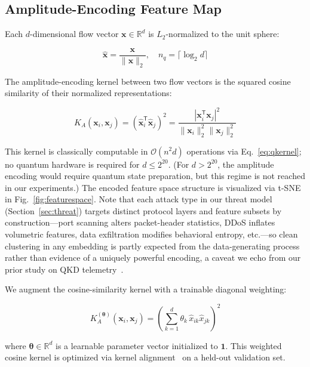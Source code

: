 \documentclass[twocolumn,a4paper,11pt]{article}
\begin{document}
\subsection{Amplitude-Encoding Feature Map}

Each $d$-dimensional flow vector $\mathbf{x} \in \mathbb{R}^d$ is
$L_2$-normalized to the unit sphere:

\begin{equation}
\hat{\mathbf{x}} = \frac{\mathbf{x}}{\|\mathbf{x}\|_2}, \quad
n_q = \lceil \log_2 d \rceil
\label{eq:amplitude_encoding}
\end{equation}

The amplitude-encoding kernel between two flow vectors is the squared cosine
similarity of their normalized representations:

\begin{equation}
K_A(\mathbf{x}_i, \mathbf{x}_j) = \left(\hat{\mathbf{x}}_i^\mathsf{T} \hat{\mathbf{x}}_j\right)^2
= \frac{|\mathbf{x}_i^\mathsf{T} \mathbf{x}_j|^2}{\|\mathbf{x}_i\|_2^2 \|\mathbf{x}_j\|_2^2}
\label{eq:qkernel}
\end{equation}

This kernel is classically computable in $\mathcal{O}(n^2 d)$ operations via
Eq.~\ref{eq:qkernel}; no quantum hardware is required for $d \leq 2^{20}$.
(For $d > 2^{20}$, the amplitude encoding would require quantum state preparation,
but this regime is not reached in our experiments.) The encoded feature space
structure is visualized via t-SNE in Fig.~\ref{fig:featurespace}. Note that each
attack type in our threat model (Section~\ref{sec:threat}) targets distinct
protocol layers and feature subsets by construction---port scanning alters
packet-header statistics, DDoS inflates volumetric features, data exfiltration
modifies behavioral entropy, etc.---so clean clustering in any embedding is
partly expected from the data-generating process rather than evidence of a
uniquely powerful encoding, a caveat we echo from our prior study on QKD
telemetry~\cite{kapoor2024hyqad}.

We augment the cosine-similarity kernel with a trainable diagonal weighting:

\begin{equation}
K_A^{(\boldsymbol{\theta})}(\mathbf{x}_i, \mathbf{x}_j) =
\left(\sum_{k=1}^{d} \theta_k \, \hat{x}_{ik} \hat{x}_{jk}\right)^2
\label{eq:qkernel_trainable}
\end{equation}

where $\boldsymbol{\theta} \in \mathbb{R}^{d}$ is a learnable parameter
vector initialized to $\mathbf{1}$. This weighted cosine kernel is optimized via
kernel alignment~\cite{cristianini2002kernel} on a held-out validation set.
\end{document}
